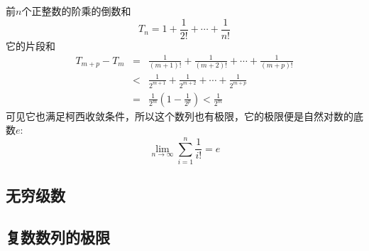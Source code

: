 \begin{example}
  前$n$个正整数的阶乘的倒数和
  \[ T_n = 1 + \frac{1}{2!} + \cdots + \frac{1}{n!} \]
  它的片段和
  \begin{eqnarray*}
    T_{m+p} - T_m & = & \frac{1}{(m+1)!} + \frac{1}{(m+2)!} + \cdots + \frac{1}{(m+p)!} \\
                  & < & \frac{1}{2^{m+1}} + \frac{1}{2^{m+2}} + \cdots + \frac{1}{2^{m+p}} \\
    & = & \frac{1}{2^m} \left( 1-\frac{1}{2^p} \right) < \frac{1}{2^m}
  \end{eqnarray*}
  可见它也满足柯西收敛条件，所以这个数列也有极限，它的极限便是自然对数的底数$e$:
  \[ \lim_{n \to \infty} \sum_{i=1}^n \frac{1}{i!} = e \]
\end{example}


\subsection{无穷级数}
\label{sec:infinite-series}

\subsection{复数数列的极限}
\label{sec:limit-of-complex-number-sequence}



